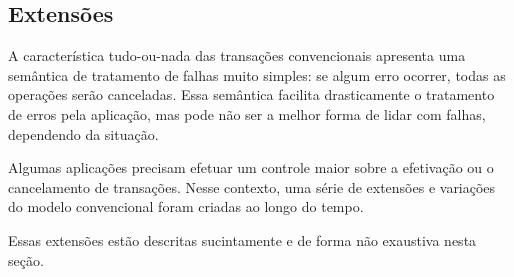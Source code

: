 \documentclass[11pt,twoside,a4paper]{book}
\begin{document}




\subsection{Extensões}
\label{subsec:extensoes}
A característica tudo-ou-nada das transações convencionais apresenta uma semântica de tratamento de falhas muito simples: se algum erro ocorrer, todas as operações serão canceladas. Essa semântica facilita drasticamente o tratamento de erros pela aplicação, mas pode não ser a melhor forma de lidar com falhas, dependendo da situação.

Algumas aplicações precisam efetuar um controle maior sobre a efetivação ou o cancelamento de transações. Nesse contexto, uma série de extensões e variações do modelo convencional foram criadas ao longo do tempo.

Essas extensões estão descritas sucintamente e de forma não exaustiva nesta seção.
\end{document}
